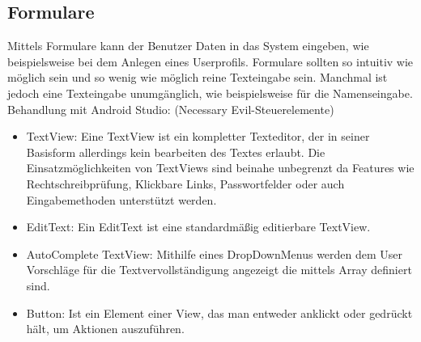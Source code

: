 \documentclass[FIPLY_base.tex]{subfiles}
\begin{document}
\subsection{Formulare}
Mittels Formulare kann der Benutzer Daten in das System eingeben, wie beispielsweise bei dem Anlegen eines Userprofils. Formulare sollten so intuitiv wie möglich sein und so wenig wie möglich reine Texteingabe sein. Manchmal ist jedoch eine Texteingabe unumgänglich, wie beispielsweise für die Namenseingabe.
Behandlung mit Android Studio: (Necessary Evil-Steuerelemente)

\begin{itemize}
	\item TextView: Eine TextView ist ein kompletter Texteditor, der in seiner Basisform allerdings kein bearbeiten des Textes erlaubt. Die Einsatzmöglichkeiten von TextViews sind beinahe unbegrenzt da Features wie Rechtschreibprüfung, Klickbare Links, Passwortfelder oder auch Eingabemethoden unterstützt werden.
	\item EditText: Ein EditText ist eine standardmäßig editierbare TextView.
	\item AutoComplete TextView: Mithilfe eines DropDownMenus werden dem User Vorschläge für die Textvervollständigung angezeigt die mittels Array definiert sind.
	\item Button: Ist ein Element einer View, das man entweder anklickt oder gedrückt hält, um Aktionen auszuführen.
\end{itemize}
\end{document}
